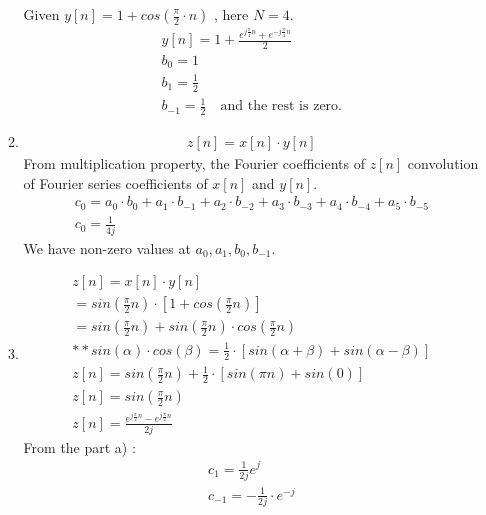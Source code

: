 \documentclass[10pt,a4paper, margin=1in]{article}
\begin{document}
\begin{enumerate}
\begin{enumerate}
    Given $ y[n] = 1 + cos(\frac{\pi}{2} \cdot n)  $ , here $N = 4$.
    \begin{align*}
        y[n] = 1 + \frac{ e^{j\frac{\pi}{4}n} + e^{-j\frac{\pi}{4}n} }{ 2 } \\
        b_0 = 1 \\
        b_1 = \frac{1}{2} \\
        b_{-1} = \frac{1}{2} \quad \text{and the rest is zero.}
    \end{align*}
    \item %
    \begin{align*}
        z[n] = x[n] \cdot y[n]
    \end{align*}
    From multiplication property, the Fourier coefficients of $z[n]$ convolution of Fourier series coefficients of $x[n]$ and $y[n]$. \\
    \begin{align*}
        c_0 = a_0 \cdot b_0 + a_1 \cdot b_{-1} +  a_2 \cdot b_{-2} + a_3 \cdot b_{-3} + a_4 \cdot b_{-4} + a_5 \cdot b_{-5} \\
        c_0 = \frac{1}{4j}
    \end{align*}
    We have non-zero values at $a_0, a_1, b_0, b_{-1}$.
    \item %
    \begin{align*}
        z[n] = x[n] \cdot y[n] \\
        = sin(\frac{\pi}{2} n) \cdot [1 + cos(\frac{\pi}{2} n)] \\
        = sin(\frac{\pi}{2} n) + sin(\frac{\pi}{2} n) \cdot cos(\frac{\pi}{2} n) \\
        ** sin(\alpha) \cdot cos(\beta) = \frac{1}{2} \cdot [sin(\alpha + \beta) + sin(\alpha - \beta)] \\
        z[n] = sin(\frac{\pi}{2} n) + \frac{1}{2} \cdot [sin(\pi n) + sin(0)] \\
        z[n] = sin(\frac{\pi}{2} n) \\
        z[n] =  \frac{ e^{j\frac{\pi}{2}n} - e^{j\frac{\pi}{2}n} }{ 2j }
    \end{align*}
    From the part a) :
    \begin{align*}
        c_1 = \frac{1}{2j} e^{j} \\
        c_{-1} = - \frac{1}{2j} \cdot e^{-j}
    \end{align*}
    \end{enumerate}


\end{enumerate}
\end{document}
